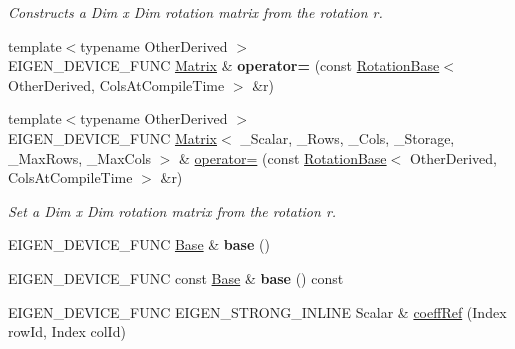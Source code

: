 \begin{DoxyCompactItemize}
\begin{DoxyCompactList}\small\item\em Constructs a Dim x Dim rotation matrix from the rotation {\itshape r}. \end{DoxyCompactList}\item 
\mbox{\label{class_eigen_1_1_matrix_a23748b53021a4ea13b54e5be9f43fb6e}} 
{\footnotesize template$<$typename Other\+Derived $>$ }\\E\+I\+G\+E\+N\+\_\+\+D\+E\+V\+I\+C\+E\+\_\+\+F\+U\+NC \mbox{\hyperlink{class_eigen_1_1_matrix}{Matrix}} \& {\bfseries operator=} (const \mbox{\hyperlink{class_eigen_1_1_rotation_base}{Rotation\+Base}}$<$ Other\+Derived, Cols\+At\+Compile\+Time $>$ \&r)
\item 
{\footnotesize template$<$typename Other\+Derived $>$ }\\E\+I\+G\+E\+N\+\_\+\+D\+E\+V\+I\+C\+E\+\_\+\+F\+U\+NC \mbox{\hyperlink{class_eigen_1_1_matrix}{Matrix}}$<$ \+\_\+\+Scalar, \+\_\+\+Rows, \+\_\+\+Cols, \+\_\+\+Storage, \+\_\+\+Max\+Rows, \+\_\+\+Max\+Cols $>$ \& \mbox{\hyperlink{class_eigen_1_1_matrix_a5893df80f2b3a446ce701616f8713229}{operator=}} (const \mbox{\hyperlink{class_eigen_1_1_rotation_base}{Rotation\+Base}}$<$ Other\+Derived, Cols\+At\+Compile\+Time $>$ \&r)
\begin{DoxyCompactList}\small\item\em Set a Dim x Dim rotation matrix from the rotation {\itshape r}. \end{DoxyCompactList}\item 
\mbox{\label{class_eigen_1_1_matrix_a322485a0bc534ee24b8ce5c0df68ab50}} 
E\+I\+G\+E\+N\+\_\+\+D\+E\+V\+I\+C\+E\+\_\+\+F\+U\+NC \mbox{\hyperlink{class_eigen_1_1_matrix_a9f405923954599ec7a71ee6bad2c53f1}{Base}} \& {\bfseries base} ()
\item 
\mbox{\label{class_eigen_1_1_matrix_a323e8a05899b309009eab82a52d21e86}} 
E\+I\+G\+E\+N\+\_\+\+D\+E\+V\+I\+C\+E\+\_\+\+F\+U\+NC const \mbox{\hyperlink{class_eigen_1_1_matrix_a9f405923954599ec7a71ee6bad2c53f1}{Base}} \& {\bfseries base} () const
\item 
E\+I\+G\+E\+N\+\_\+\+D\+E\+V\+I\+C\+E\+\_\+\+F\+U\+NC E\+I\+G\+E\+N\+\_\+\+S\+T\+R\+O\+N\+G\+\_\+\+I\+N\+L\+I\+NE Scalar \& \mbox{\hyperlink{class_eigen_1_1_matrix_a25626a55b26a4323565f79d1b7c48ea8}{coeff\+Ref}} (Index row\+Id, Index col\+Id)

\end{DoxyCompactItemize}

